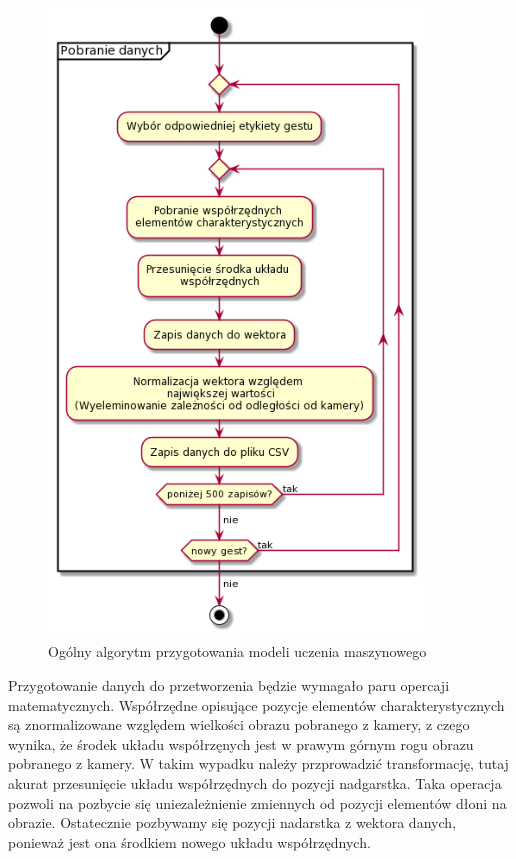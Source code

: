     \begin{figure}[H]
        \begin{center}
            \includegraphics[width=10cm]{../images/get_data.png}
            \caption{Ogólny algorytm przygotowania modeli uczenia maszynowego}
        \end{center}
    \end{figure}
    
    \quad Przygotowanie danych do przetworzenia będzie wymagało paru opercaji matematycznych. Współrzędne opisujące pozycje elementów charakterystycznych są znormalizowane względem wielkości obrazu pobranego z kamery, z czego wynika, że środek układu współrzęnych jest w prawym górnym rogu obrazu pobranego z kamery. W takim wypadku należy przprowadzić transformację, tutaj akurat przesunięcie układu współrzędnych do pozycji nadgarstka. Taka operacja pozwoli na pozbycie się uniezależnienie zmiennych od pozycji elementów dłoni na obrazie. Ostatecznie pozbywamy się pozycji nadarstka z wektora danych, ponieważ jest ona środkiem nowego układu współrzędnych. 
    
